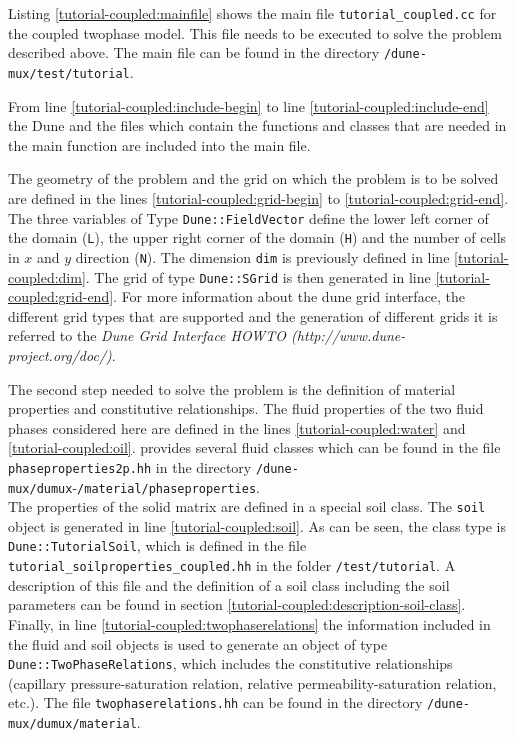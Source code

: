 Listing \ref{tutorial-coupled:mainfile} shows the main file \texttt{tutorial\_coupled.cc} for the coupled twophase model. This file needs to be executed to solve the problem described above. The main file can be found in the directory \texttt{/dune-mux/test/tutorial}.

\begin{lst}\label{tutorial-coupled:mainfile} \mbox{}

\end{lst}

From line \ref{tutorial-coupled:include-begin} to line \ref{tutorial-coupled:include-end} the Dune and the \Dumux files which contain the functions and classes that are needed in the main function are included into the main file.

The geometry of the problem and the grid on which the problem is to be solved are defined in the lines \ref{tutorial-coupled:grid-begin} to \ref{tutorial-coupled:grid-end}. The three variables of Type \texttt{Dune::FieldVector} define the lower left corner of the domain (\texttt{L}), the upper right corner of the domain (\texttt{H}) and the number of cells in $x$ and $y$ direction (\texttt{N}). The dimension \texttt{dim} is previously defined in line \ref{tutorial-coupled:dim}. The grid of type \texttt{Dune::SGrid} is then generated in line \ref{tutorial-coupled:grid-end}. For more information about the dune grid interface, the different grid types that are supported and the generation of different grids it is referred to the \textit{Dune Grid Interface HOWTO (http://www.dune-project.org/doc/)}.

The second step needed to solve the problem is the definition of material properties and constitutive relationships. The fluid properties of the two fluid phases considered here are defined in the lines \ref{tutorial-coupled:water} and \ref{tutorial-coupled:oil}. \Dumux provides several fluid classes which can be found in the file \texttt{phaseproperties2p.hh} in the directory \texttt{/dune-mux/dumux}-\texttt{/material/phaseproperties}. \\
The properties of the solid matrix are defined in a special soil class. The \texttt{soil} object is generated in line \ref{tutorial-coupled:soil}. As can be seen, the class type is \texttt{Dune::TutorialSoil}, which is defined in the file \texttt{tutorial\_soilproperties\_coupled.hh} in the folder \texttt{/test/tutorial}. A description of this file and the definition of a soil class including the soil parameters can be found in section \ref{tutorial-coupled:description-soil-class}. Finally, in line \ref{tutorial-coupled:twophaserelations} the information included in the fluid and soil objects is used to generate an object of type \texttt{Dune::TwoPhaseRelations}, which includes the constitutive relationships (capillary pressure-saturation relation, relative permeability-saturation relation, etc.). The file \texttt{twophaserelations.hh} can be found in the directory \texttt{/dune-mux/dumux/material}.

